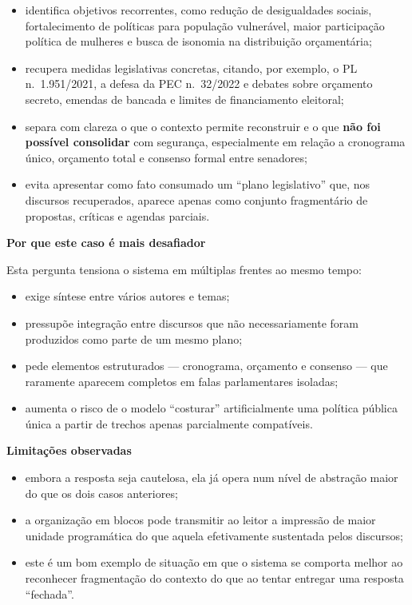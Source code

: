 \begin{itemize}
  \item identifica objetivos recorrentes, como redução de desigualdades sociais, fortalecimento de políticas para população vulnerável, maior participação política de mulheres e busca de isonomia na distribuição orçamentária;
  \item recupera medidas legislativas concretas, citando, por exemplo, o PL n.\ 1.951/2021, a defesa da PEC n.\ 32/2022 e debates sobre orçamento secreto, emendas de bancada e limites de financiamento eleitoral;
  \item separa com clareza o que o contexto permite reconstruir e o que \textbf{não foi possível consolidar} com segurança, especialmente em relação a cronograma único, orçamento total e consenso formal entre senadores;
  \item evita apresentar como fato consumado um ``plano legislativo'' que, nos discursos recuperados, aparece apenas como conjunto fragmentário de propostas, críticas e agendas parciais.
\end{itemize}

\textbf{Por que este caso é mais desafiador}

Esta pergunta tensiona o sistema em múltiplas frentes ao mesmo tempo:

\begin{itemize}
  \item exige síntese entre vários autores e temas;
  \item pressupõe integração entre discursos que não necessariamente foram produzidos como parte de um mesmo plano;
  \item pede elementos estruturados --- cronograma, orçamento e consenso --- que raramente aparecem completos em falas parlamentares isoladas;
  \item aumenta o risco de o modelo ``costurar'' artificialmente uma política pública única a partir de trechos apenas parcialmente compatíveis.
\end{itemize}

\textbf{Limitações observadas}

\begin{itemize}
  \item embora a resposta seja cautelosa, ela já opera num nível de abstração maior do que os dois casos anteriores;
  \item a organização em blocos pode transmitir ao leitor a impressão de maior unidade programática do que aquela efetivamente sustentada pelos discursos;
  \item este é um bom exemplo de situação em que o sistema se comporta melhor ao reconhecer fragmentação do contexto do que ao tentar entregar uma resposta ``fechada''.
\end{itemize}

